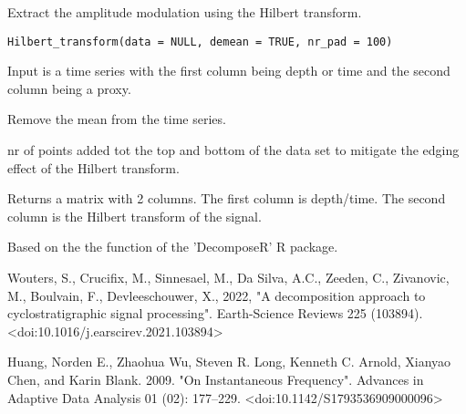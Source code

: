 \documentclass[a4paper]{book}
\begin{document}
%
\begin{Description}
Extract the amplitude modulation using the Hilbert transform.
\end{Description}
%
\begin{Usage}
\begin{verbatim}
Hilbert_transform(data = NULL, demean = TRUE, nr_pad = 100)
\end{verbatim}
\end{Usage}
%
\begin{Arguments}
\begin{ldescription}
\item[\code{data}] Input is a time series with the first column being depth or time and the second column being a proxy.

\item[\code{demean}] Remove the mean from the time series.

\item[\code{nr\_pad}] nr of points added tot the top and bottom of the data set
to mitigate the edging effect of the Hilbert transform.
\end{ldescription}
\end{Arguments}
%
\begin{Value}
Returns a matrix with 2 columns.
The first column is depth/time.
The second column is the Hilbert transform of the signal.
\end{Value}
%
\begin{Author}
Based on the the  function of the 'DecomposeR' R package.
\end{Author}
%
\begin{References}
Wouters, S., Crucifix, M., Sinnesael, M., Da Silva, A.C., Zeeden, C., Zivanovic, M., Boulvain, F.,
Devleeschouwer, X., 2022, "A decomposition approach to cyclostratigraphic signal processing".
Earth-Science Reviews 225 (103894). <doi:10.1016/j.earscirev.2021.103894>

Huang, Norden E., Zhaohua Wu, Steven R. Long, Kenneth C. Arnold, Xianyao Chen, and Karin Blank. 2009.
"On Instantaneous Frequency". Advances in Adaptive Data Analysis 01 (02): 177–229. <doi:10.1142/S1793536909000096>
\end{References}
%
\end{document}
